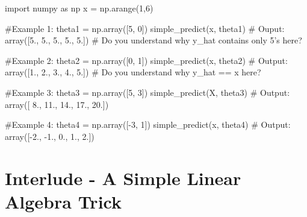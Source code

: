 \documentclass[]{article}
\newenvironment{Shaded}{\begin{snugshade}}{\end{snugshade}}
\newcommand{\CommentTok}[1]{\textcolor[rgb]{0.48,0.49,0.49}{#1}}
\newcommand{\DecValTok}[1]{\textcolor[rgb]{0.96,0.45,0.00}{#1}}
\newcommand{\FloatTok}[1]{\textcolor[rgb]{0.96,0.45,0.00}{#1}}
\newcommand{\ImportTok}[1]{\textcolor[rgb]{0.15,0.68,0.38}{#1}}
\newcommand{\NormalTok}[1]{\textcolor[rgb]{0.81,0.81,0.76}{#1}}
\newcommand{\OperatorTok}[1]{\textcolor[rgb]{0.81,0.81,0.76}{#1}}
\begin{document}
\begin{Shaded}
\begin{Highlighting}[]
\ImportTok{import}\NormalTok{ numpy }\ImportTok{as}\NormalTok{ np}
\NormalTok{x }\OperatorTok{=}\NormalTok{ np.arange(}\DecValTok{1}\NormalTok{,}\DecValTok{6}\NormalTok{)}

\CommentTok{#Example 1:}
\NormalTok{theta1 }\OperatorTok{=}\NormalTok{ np.array([}\DecValTok{5}\NormalTok{, }\DecValTok{0}\NormalTok{])}
\NormalTok{simple_predict(x, theta1)}
\CommentTok{# Ouput:}
\NormalTok{array([}\FloatTok{5.}\NormalTok{, }\FloatTok{5.}\NormalTok{, }\FloatTok{5.}\NormalTok{, }\FloatTok{5.}\NormalTok{, }\FloatTok{5.}\NormalTok{])}
\CommentTok{# Do you understand why y_hat contains only 5's here?  }


\CommentTok{#Example 2:}
\NormalTok{theta2 }\OperatorTok{=}\NormalTok{ np.array([}\DecValTok{0}\NormalTok{, }\DecValTok{1}\NormalTok{])}
\NormalTok{simple_predict(x, theta2)}
\CommentTok{# Output:}
\NormalTok{array([}\FloatTok{1.}\NormalTok{, }\FloatTok{2.}\NormalTok{, }\FloatTok{3.}\NormalTok{, }\FloatTok{4.}\NormalTok{, }\FloatTok{5.}\NormalTok{])}
\CommentTok{# Do you understand why y_hat == x here?  }


\CommentTok{#Example 3:}
\NormalTok{theta3 }\OperatorTok{=}\NormalTok{ np.array([}\DecValTok{5}\NormalTok{, }\DecValTok{3}\NormalTok{])}
\NormalTok{simple_predict(X, theta3)}
\CommentTok{# Output:}
\NormalTok{array([ }\FloatTok{8.}\NormalTok{, }\FloatTok{11.}\NormalTok{, }\FloatTok{14.}\NormalTok{, }\FloatTok{17.}\NormalTok{, }\FloatTok{20.}\NormalTok{])}


\CommentTok{#Example 4:}
\NormalTok{theta4 }\OperatorTok{=}\NormalTok{ np.array([}\OperatorTok{-}\DecValTok{3}\NormalTok{, }\DecValTok{1}\NormalTok{])}
\NormalTok{simple_predict(x, theta4)}
\CommentTok{# Output:}
\NormalTok{array([}\OperatorTok{-}\FloatTok{2.}\NormalTok{, }\FloatTok{-1.}\NormalTok{,  }\FloatTok{0.}\NormalTok{,  }\FloatTok{1.}\NormalTok{,  }\FloatTok{2.}\NormalTok{])}
\end{Highlighting}
\end{Shaded}

\clearpage

\hypertarget{interlude---a-simple-linear-algebra-trick-1}{%
\section{Interlude - A Simple Linear Algebra
Trick}\label{interlude---a-simple-linear-algebra-trick-1}}
\end{document}
